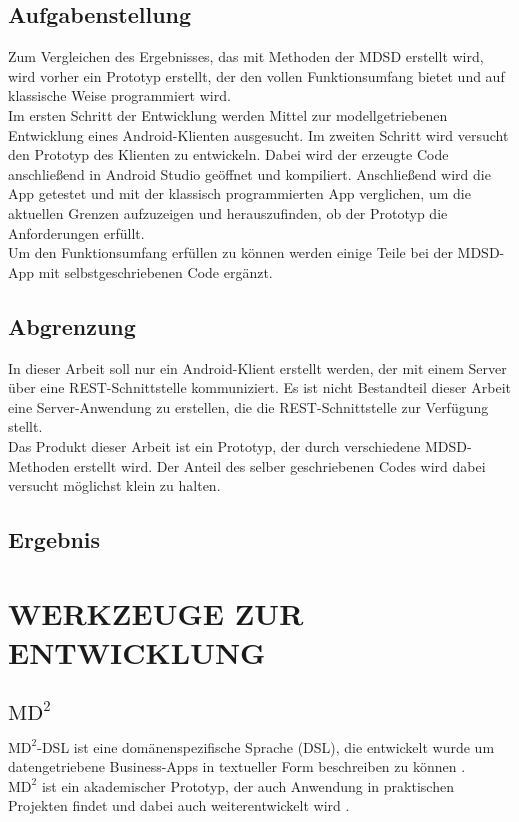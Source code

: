 \documentclass[a4paper,twoside]{article}
\begin{document}
	\subsection{Aufgabenstellung}
	Zum Vergleichen des Ergebnisses, das mit Methoden der MDSD erstellt wird, wird vorher ein Prototyp erstellt, der den vollen Funktionsumfang bietet und auf klassische Weise programmiert wird.\\
	Im ersten Schritt der Entwicklung werden Mittel zur modellgetriebenen Entwicklung eines Android-Klienten ausgesucht. Im zweiten Schritt wird versucht den Prototyp des Klienten zu entwickeln. Dabei wird der erzeugte Code anschlie\ss{}end in Android Studio ge\"offnet und kompiliert. Anschlie\ss{}end wird die App getestet und mit der klassisch programmierten App verglichen, um die aktuellen Grenzen aufzuzeigen und herauszufinden, ob der Prototyp die Anforderungen erf\"ullt.\\
	Um den Funktionsumfang erf\"ullen zu k\"onnen werden einige Teile bei der MDSD-App mit selbstgeschriebenen Code erg\"anzt.
	
	\subsection{Abgrenzung}
	In dieser Arbeit soll nur ein Android-Klient erstellt werden, der mit einem Server \"uber eine REST-Schnittstelle kommuniziert. Es ist nicht Bestandteil dieser Arbeit eine Server-Anwendung zu erstellen, die die REST-Schnittstelle zur Verf\"ugung stellt.\\
	Das Produkt dieser Arbeit ist ein Prototyp, der durch verschiedene MDSD-Methoden erstellt wird. Der Anteil des selber geschriebenen Codes wird dabei versucht m\"oglichst klein zu halten.
	
	\subsection{Ergebnis}
	
	
	\section{\uppercase{Werkzeuge zur Entwicklung}}
	
	\subsection{$\text{MD}^2$}
	$\text{MD}^2$-DSL ist eine dom\"anenspezifische Sprache (DSL), die entwickelt wurde um datengetriebene Business-Apps in textueller Form beschreiben zu k\"onnen \cite{DSLMD2_2013}.\\
	$\text{MD}^2$ ist ein akademischer Prototyp, der auch Anwendung in praktischen Projekten findet und dabei auch weiterentwickelt wird \cite{MDCP2015}.
	
\end{document}
